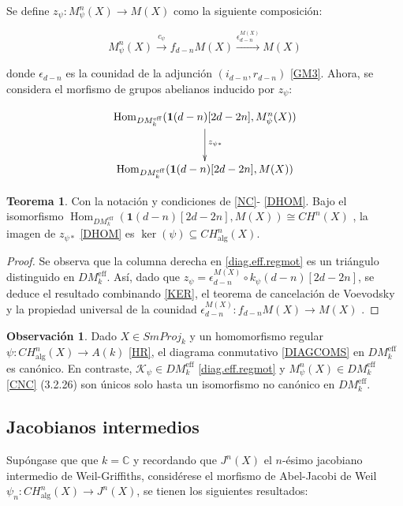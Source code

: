 \documentclass[10pt]{amsart}
\theoremstyle{definition}
\newtheorem{obs}[definition]{Observaci\'on}
\newtheorem{theorem}[definition]{Teorema}
\theoremstyle{remark}
\theoremstyle{definition}
\begin{document}
Se define $z_{\psi}:M^{n}_{\psi}(X)\to M(X)$ como la siguiente composición:

\[
M^{n}_{\psi}(X)\xrightarrow{c_{\psi}}f_{d-n}M(X)\xrightarrow{\epsilon^{M(X)}_{ d-n}}M(X)
\]

donde $\epsilon_{d-n}$ es la counidad de la adjunción $(i_{d-n},r_{d-n})$ \ref{GM3}. Ahora, se considera el morfismo de grupos abelianos inducido por $z_{\psi}$:


$$\xymatrix@R=10mm{ 
\operatorname{Hom}_{DM_{k}^{\mathrm{eff}}}(\mathbf{1}(d-n)[2d-2n],M^{n}_{\psi}(X))
\ar@{->}[d]^{z_{\psi*}} \\
\operatorname{Hom}_{DM_{k}^{\mathrm{eff}}}(\mathbf{1}(d-n)[2d-2n],M(X))
}$$\label{DHOM}




\begin{theorem}\label{TP1}
Con la notación y condiciones de \ref{NC}- \ref{DHOM}. Bajo el isomorfismo $\operatorname{Hom}_{DM_{k}^{\mathrm{eff}}}(\mathbf{1}(d-n)[2d-2n],M(X))\cong CH^{n}(X)$ \cite[Prop. 2.1.4, Thm. 3.2.6]{Voe00b}, la imagen de $z_{\psi*}$ \ref{DHOM} es $\ker(\psi)\subseteq CH^{n}_{\mathrm{alg}}(X)$.
\end{theorem}

\begin{proof}
Se observa que la columna derecha en \ref{diag.eff.regmot} es un triángulo distinguido en $DM_{k}^{\mathrm{eff}}$. Así, dado que $z_{\psi}=\epsilon^{M(X)}_{d-n}\circ k_{\psi}(d-n)[2d-2n]$, se deduce el resultado combinando \ref{KER}, el teorema de cancelación de Voevodsky \cite{Voe10a} y la propiedad universal de la counidad $\epsilon^{M(X)}_{d-n}:f_{d-n}M(X)\to M(X)$ \cite[3.3.1]{Pel17}.
\end{proof}

\begin{obs}
Dado $X\in SmProj_{k}$ y un homomorfismo regular $\psi:CH^{n}_{\mathrm{alg}}(X)\to A(k)$ \ref{HR}, el diagrama conmutativo \ref{DIAGCOMS}  en $DM_{k}^{\mathrm{eff}}$ es canónico. En contraste, $\mathcal{K}_{\psi}\in DM_{k}^{\mathrm{eff}}$ \ref{diag.eff.regmot} y $M^{n}_{\psi}(X)\in DM_{k}^{\mathrm{eff}}$ \ref{CNC} (3.2.26) son únicos solo hasta un isomorfismo no canónico en $DM_{k}^{\mathrm{eff}}$.
\end{obs}

\subsection{Jacobianos intermedios}\label{JI}
 Supóngase que  que $k=\mathbb{C}$ y recordando que $J^{n}(X)$ el $n$-ésimo jacobiano intermedio de Weil-Griffiths, considérese el morfismo de Abel-Jacobi de Weil $\psi_{n}:CH_{\mathrm{alg}}^{n}(X)\to J^{n}(X)$, se tienen los siguientes resultados:
\end{document}
